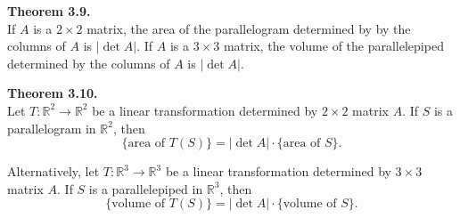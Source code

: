 \newpage

\begin{boxthm}
	\textbf{Theorem 3.9.} \\
	If $A$ is a $2 \times 2$ matrix, the area of the parallelogram determined by by the columns of $A$ is $|\det A|$. If $A$ is a $3 \times 3$ matrix, the volume of the parallelepiped determined by the columns of $A$ is $|\det A|$.
\end{boxthm}

\begin{boxthm}
	\textbf{Theorem 3.10.} \\
	Let $T: \mathbb{R}^2 \rightarrow \mathbb{R}^2$ be a linear transformation determined by $2 \times 2$ matrix $A$. If $S$ is a parallelogram in $\mathbb{R}^2$, then $$\{ \text{area of } T(S)\} = |\det A| \cdot \{ \text{area of } S \}.$$
	
	Alternatively, let $T: \mathbb{R}^3 \rightarrow \mathbb{R}^3$ be a linear transformation determined by $3 \times 3$ matrix $A$. If $S$ is a parallelepiped in $\mathbb{R}^3$, then $$\{ \text{volume of } T(S)\} = |\det A| \cdot \{ \text{volume of } S \}.$$
\end{boxthm}

